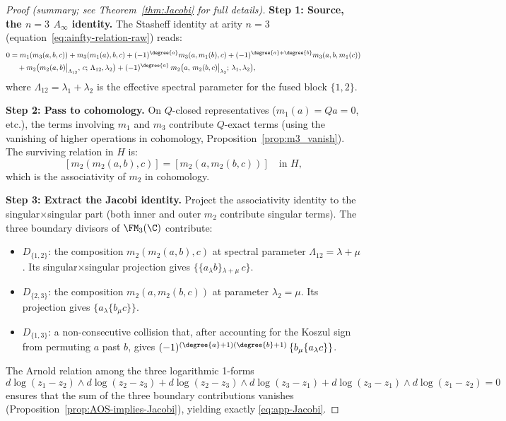 \begin{proof}[Proof (summary; see Theorem~\ref{thm:Jacobi} for full details)]
\textbf{Step 1: Source, the $n=3$ $A_\infty$ identity.}
The Stasheff identity at arity $n=3$ (equation~\eqref{eq:ainfty-relation-raw}) reads:
\begin{align*}
0 &= m_1(m_3(a,b,c)) + m_3(m_1(a),b,c) + (-1)^{\degree{a}}m_3(a,m_1(b),c) + (-1)^{\degree{a}+\degree{b}}m_3(a,b,m_1(c))\\
&\quad + m_2\bigl(m_2(a,b)\big|_{\Lambda_{12}},\, c;\, \Lambda_{12},\lambda_2\bigr) + (-1)^{\degree{a}}\,m_2\bigl(a,\, m_2(b,c)\big|_{\lambda_2};\, \lambda_1, \lambda_2\bigr),
\end{align*}
where $\Lambda_{12} = \lambda_1 + \lambda_2$ is the effective spectral parameter for the fused block $\{1,2\}$.

\textbf{Step 2: Pass to cohomology.}
On $Q$-closed representatives ($m_1(a) = Qa = 0$, etc.), the terms involving $m_1$ and $m_3$ contribute $Q$-exact terms (using the vanishing of higher operations in cohomology, Proposition~\ref{prop:m3_vanish}). The surviving relation in $H$ is:
\[
[m_2(m_2(a,b),c)] = [m_2(a,m_2(b,c))] \quad\text{in }H,
\]
which is the associativity of $m_2$ in cohomology.

\textbf{Step 3: Extract the Jacobi identity.}
Project the associativity identity to the singular$\times$singular part (both inner and outer $m_2$ contribute singular terms). The three boundary divisors of $\FM_3(\C)$ contribute:
\begin{itemize}
\item $D_{\{1,2\}}$: the composition $m_2(m_2(a,b),c)$ at spectral parameter $\Lambda_{12} = \lambda + \mu$. Its singular$\times$singular projection gives $\{\{a{}_\lambda b\}{}_{\lambda+\mu}\,c\}$.
\item $D_{\{2,3\}}$: the composition $m_2(a,m_2(b,c))$ at parameter $\lambda_2 = \mu$. Its projection gives $\{a{}_\lambda \{b{}_\mu c\}\}$.
\item $D_{\{1,3\}}$: a non-consecutive collision that, after accounting for the Koszul sign from permuting $a$ past $b$, gives $(-1)^{(\degree{a}+1)(\degree{b}+1)}\,\{b{}_\mu \{a{}_\lambda c\}\}$.
\end{itemize}
The Arnold relation among the three logarithmic 1-forms
\[
d\log(z_1-z_2)\wedge d\log(z_2-z_3) + d\log(z_2-z_3)\wedge d\log(z_3-z_1) + d\log(z_3-z_1)\wedge d\log(z_1-z_2) = 0
\]
ensures that the sum of the three boundary contributions vanishes (Proposition~\ref{prop:AOS-implies-Jacobi}), yielding exactly \eqref{eq:app-Jacobi}.


\end{proof}
